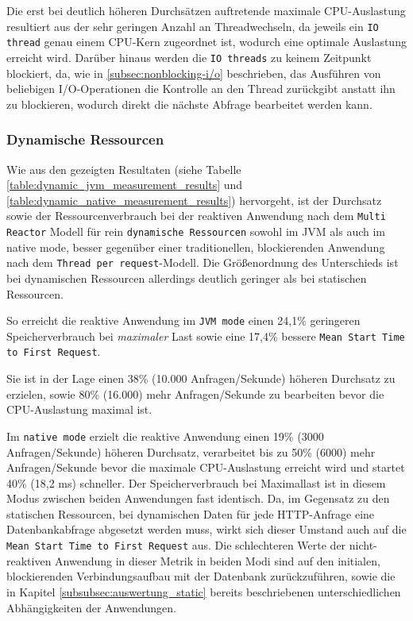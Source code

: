 Die erst bei deutlich höheren Durchsätzen auftretende maximale CPU-Auslastung resultiert aus der sehr geringen Anzahl an Threadwechseln,
da jeweils ein \verb|IO thread| genau einem CPU-Kern zugeordnet ist, wodurch eine optimale Auslastung erreicht
wird. Darüber hinaus werden die \verb|IO threads| zu keinem Zeitpunkt blockiert, da, wie in \ref{subsec:nonblocking-i/o}
beschrieben, das Ausführen von beliebigen I/O-Operationen die Kontrolle an den Thread zurückgibt anstatt ihn zu blockieren,
wodurch direkt die nächste Abfrage bearbeitet werden kann.
\subsubsection{Dynamische Ressourcen}
\label{subsubsec:auswertung_dynamic}
Wie aus den gezeigten Resultaten (siehe Tabelle \ref{table:dynamic_jvm_measurement_results} und
\ref{table:dynamic_native_measurement_results}) hervorgeht, ist der Durchsatz sowie der Ressourcenverbrauch bei der
reaktiven Anwendung nach dem \verb|Multi Reactor| Modell für rein \verb|dynamische Ressourcen| sowohl im JVM als auch im native mode,
besser gegenüber einer traditionellen, blockierenden Anwendung nach dem \verb|Thread per request|-Modell.
Die Größenordnung des Unterschieds ist bei dynamischen Ressourcen allerdings deutlich geringer als bei statischen Ressourcen.

So erreicht die reaktive Anwendung im \verb|JVM mode| einen 24,1\% geringeren Speicherverbrauch bei \textit{maximaler} Last
sowie eine 17,4\% bessere \verb|Mean Start Time to First Request|.

Sie ist in der Lage einen 38\% (10.000 Anfragen/Sekunde) höheren Durchsatz zu erzielen,
sowie 80\% (16.000) mehr Anfragen/Sekunde zu bearbeiten bevor die CPU-Auslastung maximal ist.

Im \verb|native mode| erzielt die reaktive Anwendung einen 19\% (3000 Anfragen/Sekunde) höheren Durchsatz, verarbeitet bis zu
50\% (6000) mehr Anfragen/Sekunde bevor die maximale CPU-Auslastung erreicht wird und startet 40\% (18,2 ms) schneller.
Der Speicherverbrauch bei Maximallast ist in diesem Modus zwischen beiden Anwendungen fast identisch.
Da, im Gegensatz zu den statischen Ressourcen, bei dynamischen Daten für jede HTTP-Anfrage eine Datenbankabfrage abgesetzt werden
muss, wirkt sich dieser Umstand auch auf die \verb|Mean Start Time to First Request| aus.
Die schlechteren Werte der nicht-reaktiven Anwendung in dieser Metrik in beiden Modi sind auf den initialen, blockierenden
Verbindungsaufbau mit der Datenbank zurückzuführen, sowie die in Kapitel \ref{subsubsec:auswertung_static} bereits
beschriebenen unterschiedlichen Abhängigkeiten der Anwendungen.

